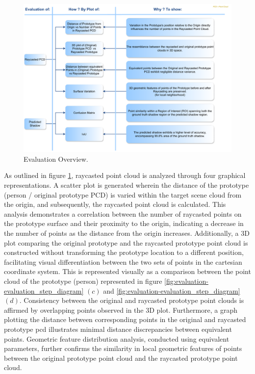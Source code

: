 \begin{figure}[htbp]
    \centering
    \includegraphics[width=1\linewidth]{97_graphics//evaluation/evaluation_block_diagram.pdf}
    \caption{Evaluation Overview.}
    \label{fig:evaluation-evaluation_block_diagram}
\end{figure}

As outlined in figure \ref{fig:evaluation-evaluation_block_diagram}, raycasted point cloud is analyzed through four graphical representations. A scatter plot is generated wherein the distance of the prototype (person / original prototype PCD) is varied within the target scene cloud from the origin, and subsequently, the raycasted point cloud is calculated. This analysis demonstrates a correlation between the number of raycasted points on the prototype surface and their proximity to the origin, indicating a decrease in the number of points as the distance from the origin increases. Additionally, a 3D plot comparing the original prototype and the raycasted prototype point cloud is constructed without transforming the prototype location to a different position, facilitating visual differentiation between the two sets of points in the cartesian coordinate system. This is represented visually as a comparison between the point cloud of the prototype (person) represented in figure \ref{fig:evaluation-evaluation_step_diagram} \((c)\) and \ref{fig:evaluation-evaluation_step_diagram} \((d)\). Consistency between the original and raycasted prototype point clouds is affirmed by overlapping points observed in the 3D plot. Furthermore, a graph plotting the distance between corresponding points in the original and raycasted prototype \acrshort{pcd} illustrates minimal distance discrepancies between equivalent points. Geometric feature distribution analysis, conducted using equivalent parameters, further confirms the similarity in local geometric features of points between the original prototype point cloud and the raycasted prototype point cloud.

